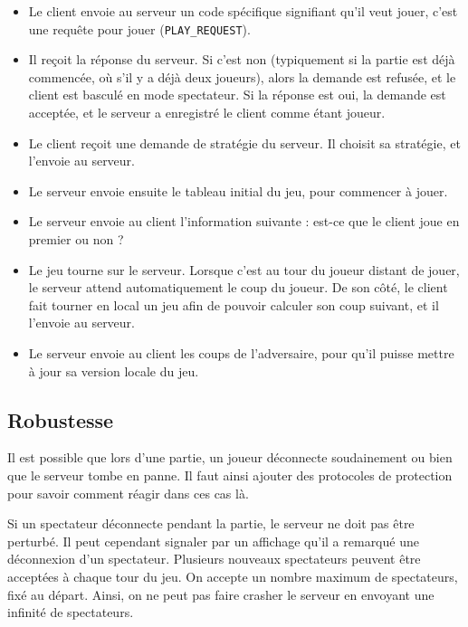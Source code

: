 \documentclass[a4paper]{article}
\newcommand{\TODO}{\textcolor{red}{\textbf{TODO}}}
\begin{document}
%
\begin{itemize}
	\setlength\itemsep{0.5em}
	\item Le client envoie au serveur un code spécifique signifiant qu'il veut jouer, c'est une requête pour jouer (\texttt{PLAY\_REQUEST}).
	\item Il reçoit la réponse du serveur. Si c'est non (typiquement si la partie est déjà commencée, où s'il y a déjà deux joueurs), alors la demande est refusée, et le client est basculé en mode spectateur. Si la réponse est oui, la demande est acceptée, et le serveur a enregistré le client comme étant joueur.
	\item Le client reçoit une demande de stratégie du serveur. Il choisit sa stratégie, et l'envoie au serveur.
	\item Le serveur envoie ensuite le tableau initial du jeu, pour commencer à jouer.
	\item Le serveur envoie au client l'information suivante : est-ce que le client joue en premier ou non ?
	\item Le jeu tourne sur le serveur. Lorsque c'est au tour du joueur distant 
	de jouer, le serveur attend automatiquement le coup du joueur. De son côté, 
	le client fait tourner en local un jeu afin de pouvoir calculer son coup 
	suivant, et il l'envoie au serveur.
	\item Le serveur envoie au client les coups de l'adversaire, pour qu'il puisse mettre à jour sa version locale du jeu.
\end{itemize}
%


\subsection{Robustesse}

Il est possible que lors d'une partie, un joueur déconnecte soudainement ou 
bien que le serveur tombe en panne. Il faut ainsi ajouter des protocoles de 
protection pour savoir comment réagir dans ces cas là.

Si un spectateur déconnecte pendant la partie, le serveur ne doit pas être 
perturbé. Il peut cependant signaler par un affichage qu'il a remarqué une 
déconnexion d'un spectateur.
Plusieurs nouveaux spectateurs peuvent être acceptées à chaque tour du jeu. On accepte un nombre maximum de spectateurs, fixé au départ.
Ainsi, on ne peut pas faire crasher le serveur en envoyant une infinité de spectateurs. \\
\end{document}
